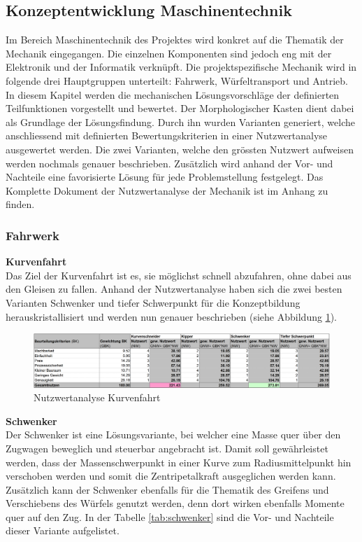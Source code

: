 \documentclass[../../main.tex]{subfiles}
\begin{document}
    \subsection{Konzeptentwicklung Maschinentechnik}
    Im Bereich Maschinentechnik des Projektes wird konkret auf die Thematik der Mechanik eingegangen. Die einzelnen Komponenten sind jedoch eng mit der Elektronik und der Informatik verknüpft. Die projektspezifische Mechanik wird in folgende drei Hauptgruppen unterteilt: Fahrwerk, Würfeltransport und Antrieb. In diesem Kapitel werden die mechanischen Lösungsvorschläge der definierten Teilfunktionen vorgestellt und bewertet. Der Morphologischer Kasten dient dabei als Grundlage der Lösungsfindung. Durch ihn wurden Varianten generiert, welche anschliessend mit definierten Bewertungskriterien in einer Nutzwertanalyse ausgewertet werden. Die zwei Varianten, welche den grössten Nutzwert aufweisen werden nochmals genauer beschrieben. Zusätzlich wird anhand der Vor- und Nachteile eine favorisierte Lösung für jede Problemstellung festgelegt. Das Komplette Dokument der Nutzwertanalyse der Mechanik ist im Anhang zu finden.

    \subsubsection{Fahrwerk}
    \textbf{Kurvenfahrt}\\
    Das Ziel der Kurvenfahrt ist es, sie möglichst schnell abzufahren, ohne dabei aus den Gleisen zu fallen. Anhand der Nutzwertanalyse haben sich die zwei besten Varianten Schwenker und tiefer Schwerpunkt für die Konzeptbildung herauskristallisiert und werden nun genauer beschrieben (siehe Abbildung \ref{fig:kurvenfahrt}).

    \begin{figure}[H] %
        \centering
        \includegraphics[width=1\textwidth]{Kurvenfahrt}
        \caption{Nutzwertanalyse Kurvenfahrt}
        \label{fig:kurvenfahrt}
    \end{figure}
    
    \textbf{Schwenker}\\
    Der Schwenker ist eine Lösungsvariante, bei welcher eine Masse quer über den Zugwagen beweglich und steuerbar angebracht ist. Damit soll gewährleistet werden, dass der Massenschwerpunkt in einer Kurve zum Radiusmittelpunkt hin verschoben werden und somit die Zentripetalkraft ausgeglichen werden kann. Zusätzlich kann der Schwenker ebenfalls für die Thematik des Greifens und Verschiebens des Würfels genutzt werden, denn dort wirken ebenfalls Momente quer auf den Zug. In der Tabelle \ref{tab:schwenker} sind die Vor- und Nachteile dieser Variante aufgelistet.
    
\end{document}
